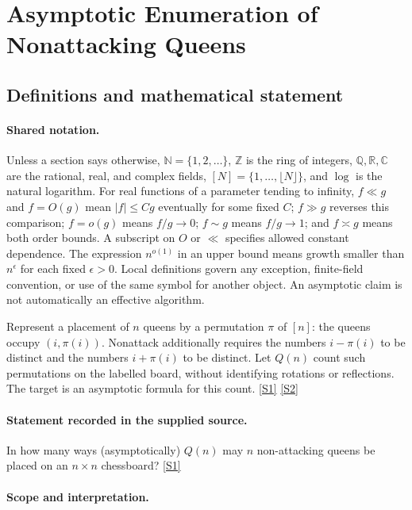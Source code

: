 \documentclass[11pt,a4paper]{article}
\newcommand{\N}{\mathbb{N}}
\newcommand{\Z}{\mathbb{Z}}
\newcommand{\Q}{\mathbb{Q}}
\newcommand{\R}{\mathbb{R}}
\newcommand{\C}{\mathbb{C}}
\newcommand{\sref}[2]{\hyperlink{source:#1:#2}{[S#2]}}
\begin{document}
\section{Asymptotic Enumeration of Nonattacking Queens}\label{statement}


\subsection{Definitions and mathematical statement}

\paragraph{Shared notation.}Unless a section says otherwise, $\N=\{1,2,\ldots\}$,
$\Z$ is the ring of integers, $\Q,\R,\C$ are the rational, real, and complex
fields, $[N]=\{1,\ldots,\lfloor N\rfloor\}$, and $\log$ is the natural
logarithm. For real functions of a parameter tending to infinity,
$f\ll g$ and $f=O(g)$ mean $|f|\leq Cg$ eventually for some fixed $C$;
$f\gg g$ reverses this comparison; $f=o(g)$ means $f/g\to0$;
$f\sim g$ means $f/g\to1$; and $f\asymp g$ means both order bounds.
A subscript on $O$ or $\ll$ specifies allowed constant dependence.
The expression $n^{o(1)}$ in an upper bound means growth smaller than
$n^\epsilon$ for each fixed $\epsilon>0$. Local definitions govern any
exception, finite-field convention, or use of the same symbol for another
object. An asymptotic claim is not automatically an effective algorithm.



Represent a placement of $n$ queens by a permutation $\pi$ of $[n]$: the queens occupy $(i,\pi(i))$. Nonattack additionally requires the numbers $i-\pi(i)$ to be distinct and the numbers $i+\pi(i)$ to be distinct. Let $Q(n)$ count such permutations on the labelled board, without identifying rotations or reflections. The target is an asymptotic formula for this count. \sref{statement}{1} \sref{statement}{2}

\paragraph{Statement recorded in the supplied source.}
In how many ways (asymptotically) $Q(n)$ may $n$ non-attacking queens be placed on an $n \times n$ chessboard? \sref{statement}{1}

\paragraph{Scope and interpretation.}
\end{document}
